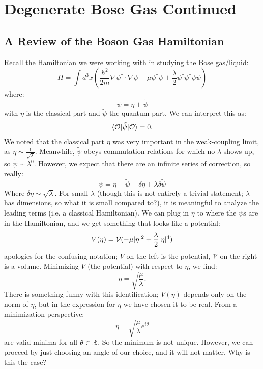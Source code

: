 \section{Degenerate Bose Gas Continued}
\subsection{A Review of the Boson Gas Hamiltonian}
Recall the Hamiltonian we were working with in studying the Bose gas/liquid:
\begin{equation}
    H = \int d^3x\left(\frac{\hbar^2}{2m}\nabla \psi^\dag \cdot \nabla \psi - \mu \psi^\dag \psi + \frac{\lambda}{2}\psi^\dag\psi^\dag\psi\psi\right)
\end{equation}
where:
\begin{equation}
    \psi = \eta + \tilde{\psi}
\end{equation}
with $\eta$ is the classical part and $\tilde{\psi}$ the quantum part. We can interpret this as:
\begin{equation}
    \langle \mathcal{O} \rvert\tilde{\psi}\lvert \mathcal{O} \rangle = 0.
\end{equation}
We noted that the classical part $\eta$ was very important in the weak-coupling limit, as $\eta \sim \frac{1}{\sqrt{\lambda}}$. Meanwhile, $\tilde{\psi}$ obeys commutation relations for which no $\lambda$ shows up, so $\tilde{\psi} \sim \lambda^0$. However, we expect that there are an infinite series of correction, so really:
\begin{equation}
    \psi = \eta + \tilde{\psi} + \delta \eta + \lambda \delta \tilde{\psi}
\end{equation}
Where $\delta \eta \sim \sqrt{\lambda}$. For small $\lambda$ (though this is not entirely a trivial statement; $\lambda$ has dimensions, so what it is small compared to?), it is meaningful to analyze the leading terms (i.e. a classical Hamiltonian). We can plug in $\eta$ to where the $\psi$s are in the Hamiltonian, and we get something that looks like a potential:
\begin{equation}
    V(\eta) = \mathcal{V}(-\mu\lvert \eta \rvert^2 + \frac{\lambda}{2}\lvert \eta \rvert^4)
\end{equation}
apologies for the confusing notation; $V$ on the left is the potential, $\mathcal{V}$ on the right is a volume. Minimizing $V$ (the potential) with respect to $\eta$, we find:
\begin{equation}
    \eta = \sqrt{\frac{\mu}{\lambda}}.
\end{equation}
There is something funny with this identification; $V(\eta)$ depends only on the norm of $\eta$, but in the expression for $\eta$ we have chosen it to be real. From a minimization perspective:
\begin{equation}
    \eta = \sqrt{\frac{\mu}{\lambda}}e^{i\theta}
\end{equation}
are valid minima for all $\theta \in \mathbb{R}$. So the minimum is not unique. However, we can proceed by just choosing an angle of our choice, and it will not matter. Why is this the case? 


